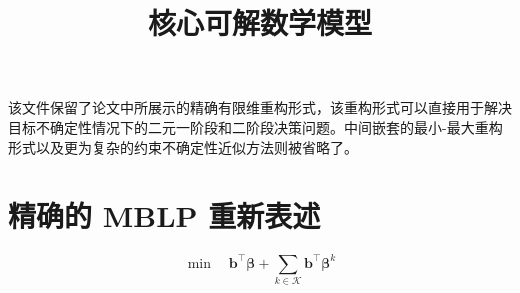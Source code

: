 \documentclass{article}
\title{核心可解数学模型}
\author{}
\date{}
\begin{document}
\maketitle

该文件保留了论文中所展示的精确有限维重构形式，该重构形式可以直接用于解决目标不确定性情况下的二元一阶段和二阶段决策问题。中间嵌套的最小-最大重构形式以及更为复杂的约束不确定性近似方法则被省略了。

\section{精确的 MBLP 重新表述}

\begin{equation}
\min \quad \boldsymbol{b}^{\top}\boldsymbol{\beta} + \sum_{k\in\mathcal{K}} \boldsymbol{b}^{\top}\boldsymbol{\beta}^k
\tag{EC.12}
\end{equation}
\end{document}
